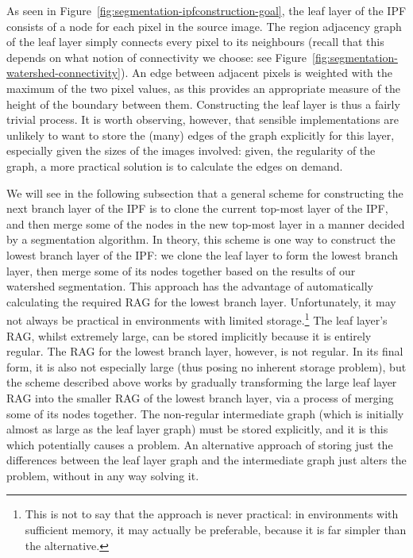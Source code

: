 As seen in Figure~\ref{fig:segmentation-ipfconstruction-goal}, the leaf layer of the IPF consists of a node for each pixel in the source image. The region adjacency graph of the leaf layer simply connects every pixel to its neighbours (recall that this depends on what notion of connectivity we choose: see Figure~\ref{fig:segmentation-watershed-connectivity}). An edge between adjacent pixels is weighted with the maximum of the two pixel values, as this provides an appropriate measure of the height of the boundary between them. Constructing the leaf layer is thus a fairly trivial process. It is worth observing, however, that sensible implementations are unlikely to want to store the (many) edges of the graph explicitly for this layer, especially given the sizes of the images involved: given, the regularity of the graph, a more practical solution is to calculate the edges on demand.

We will see in the following subsection that a general scheme for constructing the next branch layer of the IPF is to clone the current top-most layer of the IPF, and then merge some of the nodes in the new top-most layer in a manner decided by a segmentation algorithm. In theory, this scheme is one way to construct the lowest branch layer of the IPF: we clone the leaf layer to form the lowest branch layer, then merge some of its nodes together based on the results of our watershed segmentation. This approach has the advantage of automatically calculating the required RAG for the lowest branch layer. Unfortunately, it may not always be practical in environments with limited storage.\footnote{This is not to say that the approach is never practical: in environments with sufficient memory, it may actually be preferable, because it is far simpler than the alternative.} The leaf layer's RAG, whilst extremely large, can be stored implicitly because it is entirely regular. The RAG for the lowest branch layer, however, is not regular. In its final form, it is also not especially large (thus posing no inherent storage problem), but the scheme described above works by gradually transforming the large leaf layer RAG into the smaller RAG of the lowest branch layer, via a process of merging some of its nodes together. The non-regular intermediate graph (which is initially almost as large as the leaf layer graph) must be stored explicitly, and it is this which potentially causes a problem. An alternative approach of storing just the differences between the leaf layer graph and the intermediate graph just alters the problem, without in any way solving it.

